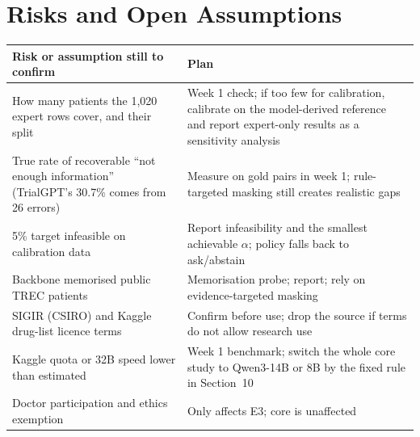 \documentclass[10pt,a4paper]{article}
\begin{document}
\section{Risks and Open Assumptions}
\begin{table}[H]
\centering\footnotesize
\begin{tabularx}{\textwidth}{@{}LL@{}}
\toprule
\textbf{Risk or assumption still to confirm} & \textbf{Plan}\\
\midrule
How many patients the 1{,}020 expert rows cover, and their split & Week 1 check; if too few for calibration, calibrate on the model-derived reference and report expert-only results as a sensitivity analysis\\
True rate of recoverable ``not enough information'' (TrialGPT's 30.7\% comes from 26 errors) & Measure on gold pairs in week 1; rule-targeted masking still creates realistic gaps\\
5\% target infeasible on calibration data & Report infeasibility and the smallest achievable \(\alpha\); policy falls back to ask/abstain\\
Backbone memorised public TREC patients & Memorisation probe; report; rely on evidence-targeted masking\\
SIGIR (CSIRO) and Kaggle drug-list licence terms & Confirm before use; drop the source if terms do not allow research use\\
Kaggle quota or 32B speed lower than estimated & Week 1 benchmark; switch the whole core study to Qwen3-14B or 8B by the fixed rule in Section~10\\
Doctor participation and ethics exemption & Only affects E3; core is unaffected\\
\bottomrule
\end{tabularx}
\end{table}
\end{document}
